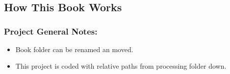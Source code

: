 \documentclass[class=book , crop=false]{standalone}
\title{}  %
\begin{document}

\ifstandalone
\maketitle %
\tableofcontents %
\clearpage
\fi

\subsection{How This Book Works}
\subsubsection{Project General Notes:}
\begin{itemize}
\item Book folder can be renamed an moved.
\item This project is coded with relative paths from processing folder down.
\end{itemize}
\end{document}
